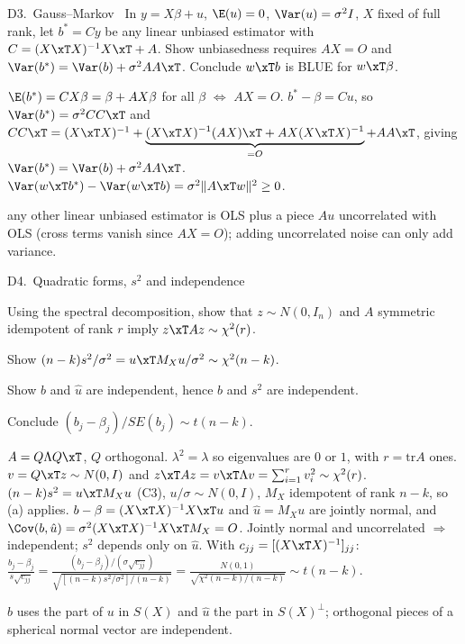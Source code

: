 \begin{qbox}{D3.\ Gauss--Markov}{\likely\ \newtag}
In $y=X\beta+u$, $\E(u)=0$, $\Var(u)=\sigma^{2}I$, $X$ fixed of full rank, let $b^{*}=Cy$ be any linear unbiased estimator with
$C=(X\xT X)^{-1}X\xT+A$. Show unbiasedness requires $AX=O$ and $\Var(b^{*})=\Var(b)+\sigma^{2}AA\xT$. Conclude $w\xT b$ is BLUE for $w\xT\beta$.
\end{qbox}
\begin{solbox}
 $\E(b^{*})=CX\beta=\beta+AX\beta$ for all $\beta$ $\iff$ $AX=O$.
 $b^{*}-\beta=Cu$, so $\Var(b^{*})=\sigma^{2}CC\xT$ and
$CC\xT=(X\xT X)^{-1}+\underbrace{(X\xT X)^{-1}(AX)\xT+AX(X\xT X)^{-1}}_{=O}+AA\xT$, giving $\Var(b^{*})=\Var(b)+\sigma^{2}AA\xT$.
 $\Var(w\xT b^{*})-\Var(w\xT b)=\sigma^{2}\|A\xT w\|^{2}\ge0$.
\begin{why}\Why any other linear unbiased estimator is OLS plus a piece $Au$ uncorrelated with OLS (cross terms vanish since $AX=O$);
adding uncorrelated noise can only add variance.\end{why}
\end{solbox}

\begin{qbox}{D4.\ Quadratic forms, $s^{2}$ and independence}{\likely\ \newtag}
\begin{flatlist}
  \item[(a)] Using the spectral decomposition, show that $z\sim N(0,I_{n})$ and $A$ symmetric idempotent of rank $r$ imply $z\xT Az\sim\chi^{2}(r)$.
  \item[(b)] Show $(n-k)s^{2}/\sigma^{2}=u\xT M_{X}u/\sigma^{2}\sim\chi^{2}(n-k)$.
  \item[(c)] Show $b$ and $\hat u$ are independent, hence $b$ and $s^{2}$ are independent.
  \item[(d)] Conclude $(b_{j}-\beta_{j})/SE(b_{j})\sim t(n-k)$.
\end{flatlist}
\end{qbox}
\begin{solbox}
 $A=Q\Lambda Q\xT$, $Q$ orthogonal. $\lambda^{2}=\lambda$ so eigenvalues are $0$ or $1$, with $r=\mathrm{tr}A$ ones. $v=Q\xT z\sim N(0,I)$ and
$z\xT Az=v\xT\Lambda v=\sum_{i=1}^{r}v_{i}^{2}\sim\chi^{2}(r)$.
 $(n-k)s^{2}=u\xT M_{X}u$ (C3), $u/\sigma\sim N(0,I)$, $M_{X}$ idempotent of rank $n-k$, so (a) applies.
 $b-\beta=(X\xT X)^{-1}X\xT u$ and $\hat u=M_{X}u$ are jointly normal, and
$\Cov(b,\hat u)=\sigma^{2}(X\xT X)^{-1}X\xT M_{X}=O$. Jointly normal and uncorrelated $\Rightarrow$ independent; $s^{2}$ depends only on $\hat u$.
 With $c_{jj}=[(X\xT X)^{-1}]_{jj}$:
$\frac{b_{j}-\beta_{j}}{s\sqrt{c_{jj}}}=\frac{(b_{j}-\beta_{j})/(\sigma\sqrt{c_{jj}})}{\sqrt{[(n-k)s^{2}/\sigma^{2}]/(n-k)}}=\frac{N(0,1)}{\sqrt{\chi^{2}(n-k)/(n-k)}}\sim t(n-k)$.
\begin{why}\Why $b$ uses the part of $u$ in $S(X)$ and $\hat u$ the part in $S(X)^{\perp}$; orthogonal pieces of a spherical normal vector are independent.\end{why}
\end{solbox}

